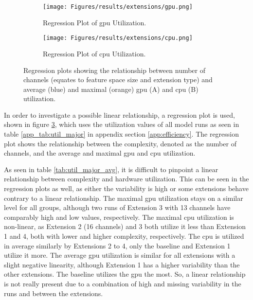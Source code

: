 \begin{figure}[htb]
    \centering
    \begin{subfigure}{.49\textwidth}
        \centering
        \texttt{[image: Figures/results/extensions/gpu.png]}
        \caption{Regression Plot of \gls{gpu} Utilization.}
        \label{fig:gpu_reg}
    \end{subfigure}
    \begin{subfigure}{.49\textwidth}
        \centering
        \texttt{[image: Figures/results/extensions/cpu.png]}
        \caption{Regression Plot of \gls{cpu} Utilization.}
        \label{fig:cpu_reg}
    \end{subfigure}
    \caption[Regression Plots of  \&  Utilization]{Regression plots showing the relationship between number of channels (equates to feature space size and extension type) and average (blue) and maximal (orange) \gls{gpu} (A) and \gls{cpu} (B) utilization.}
    \label{fig:major_reg}
\end{figure}

In order to investigate a possible linear relationship, a regression plot is used, shown in figure \ref{fig:major_reg}, which uses the utilization values of all model runs as seen in table \ref{app_tab:util_major} in appendix section \ref{app:efficiency}. The regression plot shows the relationship between the complexity, denoted as the number of channels, and the average and maximal \gls{gpu} and \gls{cpu} utilization.

As seen in table \ref{tab:util_major_avg}, it is difficult to pinpoint a linear relationship between complexity and hardware utilization. This can be seen in the regression plots as well, as either the variability is high or some extensions behave contrary to a linear relationship. The maximal \gls{gpu} utilization stays on a similar level for all groups, although two runs of Extension 3 with 13 channels have comparably high and low values, respectively. The maximal \gls{cpu} utilization is non-linear, as Extension 2 (16 channels) and 3 both utilize it less than Extension 1 and 4, both with lower and higher complexity, respectively. The \gls{cpu} is utilized in average similarly by Extensions 2 to 4, only the baseline and Extension 1 utilize it more. The average \gls{gpu} utilization is similar for all extensions with a slight negative linearity, although {\nobreak Extension 1} has a higher variability than the other extensions. The baseline utilizes the \gls{gpu} the most. So, a linear relationship is not really present due to a combination of high and missing variability in the runs and between the extensions.

